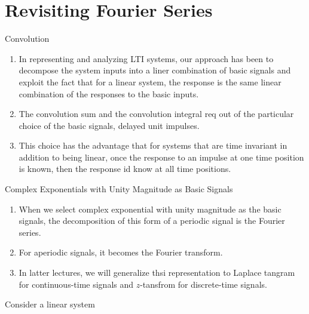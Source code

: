\section{Revisiting Fourier Series}
\begin{frame}{Convolution}
    \begin{enumerate}
      \item In representing and analyzing LTI systems, our approach has been to decompose the system inputs into a liner combination of basic signals and exploit the fact that for a linear system, the response is the same linear combination of the responses to the basic inputs.
      \item The convolution sum and the convolution integral req out of the particular choice of the basic signals, delayed unit impulses.
      \item This choice has the advantage that for systems that are time invariant in addition to being linear, once the response to an impulse at one time position is known, then the response id know at all time positions. 
    \end{enumerate}
\end{frame}

\begin{frame}{Complex Exponentials with Unity Magnitude as Basic Signals}
    \begin{enumerate}
      \item When we select complex exponential with unity magnitude as the basic signals, the decomposition of this form of a periodic signal is the Fourier series. 
      \item For aperiodic signals, it becomes the Fourier transform.
      \item In latter lectures, we will generalize thsi representation to Laplace tangram for continuous-time signals and $z$-tansfrom for discrete-time signals. 
    \end{enumerate}
\end{frame}

\begin{frame}[plain]
    Consider a linear system
                

\end{frame}